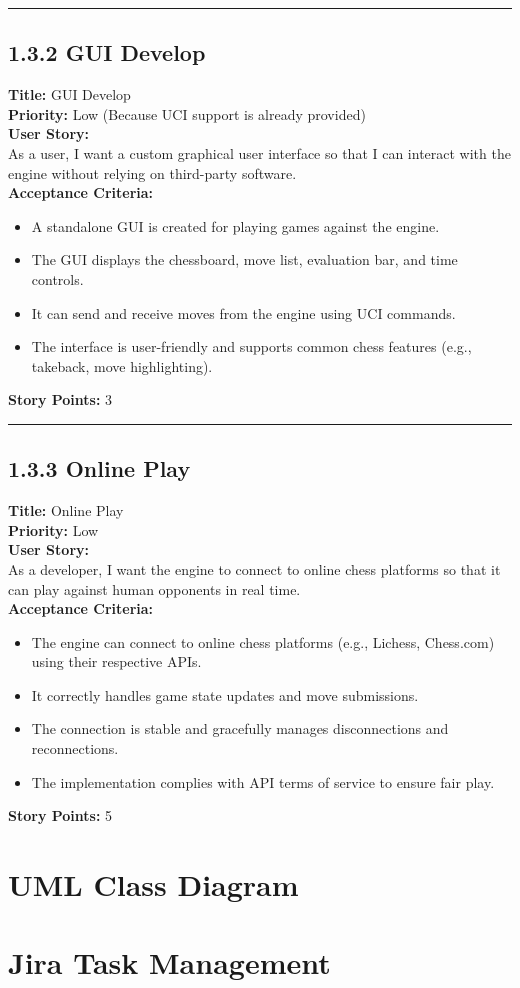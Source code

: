 \documentclass[12pt]{article}
\begin{document}
\bigskip
\hrule
\bigskip

\subsection{1.3.2 GUI Develop}
\textbf{Title:} GUI Develop\\
\textbf{Priority:} Low (Because UCI support is already provided)\\
\textbf{User Story:}\\
As a user, I want a custom graphical user interface so that I can interact with the engine without relying on third-party software.\\
\textbf{Acceptance Criteria:}
\begin{itemize}
    \item A standalone GUI is created for playing games against the engine.
    \item The GUI displays the chessboard, move list, evaluation bar, and time controls.
    \item It can send and receive moves from the engine using UCI commands.
    \item The interface is user-friendly and supports common chess features (e.g., takeback, move highlighting).
\end{itemize}
\textbf{Story Points:} 3

\bigskip
\hrule
\bigskip

\subsection{1.3.3 Online Play}
\textbf{Title:} Online Play\\
\textbf{Priority:} Low\\
\textbf{User Story:}\\
As a developer, I want the engine to connect to online chess platforms so that it can play against human opponents in real time.\\
\textbf{Acceptance Criteria:}
\begin{itemize}
    \item The engine can connect to online chess platforms (e.g., Lichess, Chess.com) using their respective APIs.
    \item It correctly handles game state updates and move submissions.
    \item The connection is stable and gracefully manages disconnections and reconnections.
    \item The implementation complies with API terms of service to ensure fair play.
\end{itemize}
\textbf{Story Points:} 5

\section{UML Class Diagram}

\section{Jira Task Management}
\end{document}

